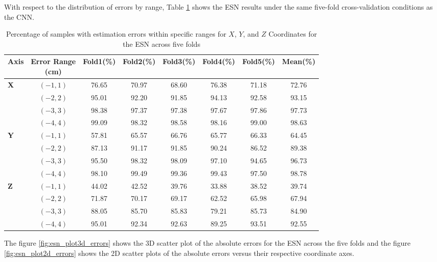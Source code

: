 With respect to the distribution of errors by range, Table \ref{tab:ESN_error_distribution_xyz} shows the ESN results under the same five-fold cross-validation conditions as the CNN.

\begin{table}[htbp]
  \centering
  \caption{Percentage of samples with estimation errors within specific ranges for $X$, $Y$, and $Z$ Coordinates for the ESN across five folds}
  \label{tab:ESN_error_distribution_xyz}
  \vspace{0.20cm}
  \footnotesize
  \begin{tabular}{lccccccc}
    \toprule
    \textbf{Axis} & \shortstack{\textbf{Error Range}\\\textbf{(cm)}} & \textbf{Fold1(\%)} & \textbf{Fold2(\%)} & \textbf{Fold3(\%)} & \textbf{Fold4(\%)} & \textbf{Fold5(\%)} & \textbf{Mean(\%)} \\
    \midrule
    \textbf{X} & $(-1, 1)$ & 76.65 & 70.97 & 68.60 & 76.38 & 71.18 & 72.76 \\
      & $(-2, 2)$ & 95.01 & 92.20 & 91.85 & 94.13 & 92.58 & 93.15 \\
      & $(-3, 3)$ & 98.38 & 97.37 & 97.38 & 97.67 & 97.86 & 97.73 \\
      & $(-4, 4)$ & 99.09 & 98.32 & 98.58 & 98.16 & 99.00 & 98.63 \\
    \midrule
    \textbf{Y} & $(-1, 1)$ & 57.81 & 65.57 & 66.76 & 65.77 & 66.33 & 64.45 \\
      & $(-2, 2)$ & 87.13 & 91.17 & 91.85 & 90.24 & 86.52 & 89.38 \\
      & $(-3, 3)$ & 95.50 & 98.32 & 98.09 & 97.10 & 94.65 & 96.73 \\
      & $(-4, 4)$ & 98.10 & 99.49 & 99.36 & 99.43 & 97.50 & 98.78 \\
    \midrule
    \textbf{Z} & $(-1, 1)$ & 44.02 & 42.52 & 39.76 & 33.88 & 38.52 & 39.74 \\
      & $(-2, 2)$ & 71.87 & 70.17 & 69.17 & 62.52 & 65.98 & 67.94 \\
      & $(-3, 3)$ & 88.05 & 85.70 & 85.83 & 79.21 & 85.73 & 84.90 \\
      & $(-4, 4)$ & 95.01 & 92.34 & 92.63 & 89.25 & 93.51 & 92.55 \\
    \bottomrule
  \end{tabular}
\end{table}


The figure \ref{fig:esn_plot3d_errors} shows the 3D scatter plot of the absolute errors for the ESN across the five folds and the figure \ref{fig:esn_plot2d_errors} shows the 2D scatter plots of the absolute errors versus their respective coordinate axes.

